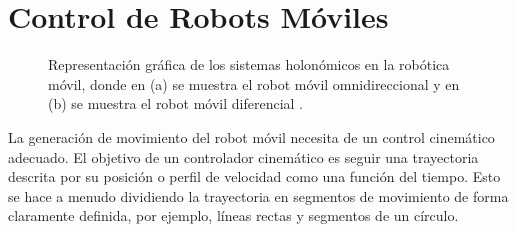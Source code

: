 \section{Control de Robots Móviles}
\begin{figure}[ht!]
     \begin{center}
    \end{center}
  \captionsetup{font=footnotesize}
    \caption{\label{f:sLocomocion}Representación gráfica de los sistemas holonómicos en la robótica
    móvil, donde en (a) se muestra el robot móvil omnidireccional \cite{Omniwheel2018} y en (b) se 
    muestra el robot móvil diferencial \cite{NoHolonomic2018}.}
\end{figure}
La generación de movimiento del robot móvil necesita de un control cinemático 
adecuado. El objetivo de un controlador cinemático es seguir una trayectoria descrita 
por su posición o perfil de velocidad como una función del tiempo. Esto se hace 
a menudo dividiendo la trayectoria en segmentos de movimiento de forma claramente 
definida, por ejemplo, líneas rectas y segmentos de un círculo.

